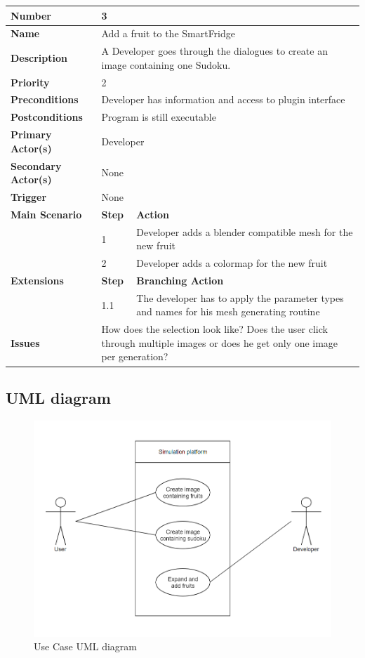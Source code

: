 \documentclass[a4paper,12pt]{article}
\begin{document}
\begin{tabularx}{\linewidth}{|l|l|X|}
\hline
\textbf{Number} & \multicolumn{2}{l|}{3} \\
\hline
\textbf{Name} & \multicolumn{2}{l|}{Add a fruit to the SmartFridge } \\
\hline
\textbf{Description} &  \multicolumn{2}{X|}{A Developer goes through the dialogues to create an image containing one Sudoku.} \\
\hline
\textbf{Priority} & \multicolumn{2}{l|}{2} \\
\hline
\textbf{Preconditions} & \multicolumn{2}{l|}{Developer has information and access to plugin interface} \\
\hline
\textbf{Postconditions} & \multicolumn{2}{l|}{Program is still executable} \\
\hline
\textbf{Primary Actor(s)} & \multicolumn{2}{l|}{Developer} \\
\hline
\textbf{Secondary Actor(s)} & \multicolumn{2}{l|}{None} \\
\hline
\textbf{Trigger} & \multicolumn{2}{l|}{None} \\
\hline
\textbf{Main Scenario} & \textbf{Step} & \textbf{Action} \\
\hline
 & 1 & Developer adds a blender compatible mesh for the new fruit\\
\cline{2-3}
 & 2 & Developer adds a colormap for the new fruit \\
\hline
\textbf{Extensions} & \textbf{Step} & \textbf{Branching Action} \\
\hline
& 1.1 & The developer has to apply the parameter types and names for his mesh generating routine \\
\hline
\textbf{Issues} & \multicolumn{2}{X|}{How does the selection look like? Does the user click through multiple images or does he get only one image per generation?} \\
\hline
\end{tabularx}
\subsection{UML diagram}
\begin{figure}[H]
\centering
\includegraphics[scale=0.45]{usecase_new_1.png}
\caption{Use Case UML diagram}
\end{figure}
\end{document}
